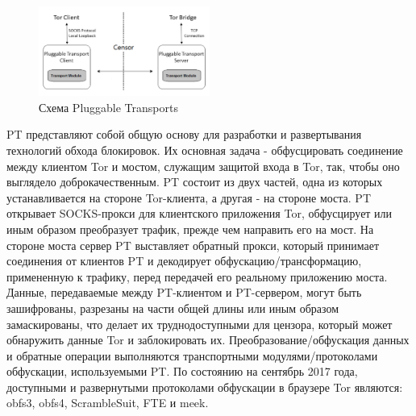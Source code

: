 \begin{figure}[h!]
    \begin{center}
        \includegraphics[width = 0.5\textwidth]{tor_pt.png}
        \caption{Схема Pluggable Transports}
    \end{center}
\end{figure}

PT представляют собой общую основу для разработки и развертывания технологий обхода блокировок.
Их основная задача - обфусцировать соединение между клиентом Tor и мостом, служащим защитой входа в Tor, так, чтобы оно выглядело доброкачественным.
PT состоит из двух частей, одна из которых устанавливается на стороне Tor-клиента, а другая - на стороне моста.
PT открывает SOCKS-прокси для клиентского приложения Tor, обфусцирует или иным образом преобразует трафик, прежде чем направить его на мост.
На стороне моста сервер PT выставляет обратный прокси, который принимает соединения от клиентов PT и декодирует обфускацию/трансформацию,
примененную к трафику, перед передачей его реальному приложению моста.
Данные, передаваемые между PT-клиентом и PT-сервером, могут быть зашифрованы, разрезаны на части общей длины или иным образом замаскированы,
что делает их труднодоступными для цензора, который может обнаружить данные Tor и заблокировать их.
Преобразование/обфускация данных и обратные операции выполняются транспортными модулями/протоколами обфускации, используемыми PT.
По состоянию на сентябрь 2017 года, доступными и развернутыми протоколами обфускации в браузере Tor являются: obfs3, obfs4, ScrambleSuit, FTE и meek.

